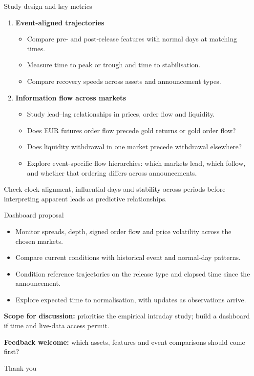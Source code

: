\documentclass[aspectratio=169,10pt]{beamer}
\begin{document}
\begin{frame}{Study design and key metrics}
\begin{enumerate}
\item \textbf{Event-aligned trajectories}
\begin{itemize}
\item Compare pre- and post-release features with normal days at matching times.
\item Measure time to peak or trough and time to stabilisation.
\item Compare recovery speeds across assets and announcement types.
\end{itemize}
\item \textbf{Information flow across markets}
\begin{itemize}
\item Study lead--lag relationships in prices, order flow and liquidity.
\item Does EUR futures order flow precede gold returns or gold order flow?
\item Does liquidity withdrawal in one market precede withdrawal elsewhere?
\item Explore event-specific flow hierarchies: which markets lead, which follow, and whether that ordering differs across announcements.
\end{itemize}
\end{enumerate}
\small
Check clock alignment, influential days and stability across periods before interpreting apparent leads as predictive relationships.
\end{frame}

\begin{frame}{Dashboard proposal}
\begin{itemize}
\item Monitor spreads, depth, signed order flow and price volatility across the chosen markets.
\item Compare current conditions with historical event and normal-day patterns.
\item Condition reference trajectories on the release type and elapsed time since the announcement.
\item Explore expected time to normalisation, with updates as observations arrive.
\end{itemize}
\vspace{5mm}
\textbf{Scope for discussion:} prioritise the empirical intraday study; build a dashboard if time and live-data access permit.

\textbf{Feedback welcome:} which assets, features and event comparisons should come first?
\end{frame}

\begin{frame}[plain]
\centering
{\color{databentopurple} Thank you}
\end{frame}
\end{document}

